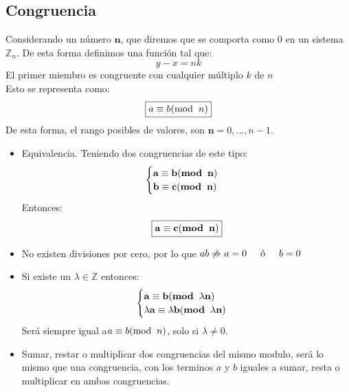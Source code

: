 \subsection{Congruencia}
\noindent Considerando un número \(\mathbf{n}\), que diremos que se comporta como 0 en un sistema \(\mathbb{Z}_n\). De esta forma definimos una función tal que:
\[
        y - x = nk
\]
\noindent El primer miembro es congruente con cualquier múltiplo \(k\) de \(n\)\\ Esto se representa como:
\[
        \boxed{a \equiv b(\textnormal{mod}\hspace{2mm}n)}
\]
\noindent De esta forma, el rango posibles de valores, son \(\mathbf{n} = {0,...,n-1}\).\par
\noindent{} \par
\begin{itemize}
        \item Equivalencia. Teniendo dos congruencias de este tipo:\[\begin{cases}
                              \mathbf{a \equiv b(\textnormal{\textbf{mod}}\hspace{2mm}n)}\\ \mathbf{b \equiv c(\textnormal{\textbf{mod}}\hspace{2mm}n)}\end{cases}\]\noindent Entonces: \[\boxed{\mathbf{a \equiv c(\textnormal{\textbf{mod}}\hspace{2mm}n)}}\]
        \item No existen divisiones por cero, por lo que \(ab \not \Rightarrow a = 0 \textnormal{\hspace{5mm}ó\hspace{5mm}} b = 0\)
        \item Si existe un \(\lambda \in \mathbb{Z}\) entonces:\[\begin{cases}
                              \mathbf{a \equiv b(\textnormal{\textbf{mod}}\hspace{2mm}\lambda n)}\\ \mathbf{\lambda a \equiv \lambda b(\textnormal{\textbf{mod}}\hspace{2mm}\lambda n)}\end{cases}\] \noindent Será siempre igual a\(a \equiv b(\textnormal{mod}\hspace{2mm}n)\), solo si \(\lambda \neq 0\).
        \item Sumar, restar o multiplicar dos congruencias del mismo modulo, será lo mismo que una congruencia, con los terminos \(a\) y \(b\) iguales a sumar, resta o multiplicar en ambas congruencias.
\end{itemize}
